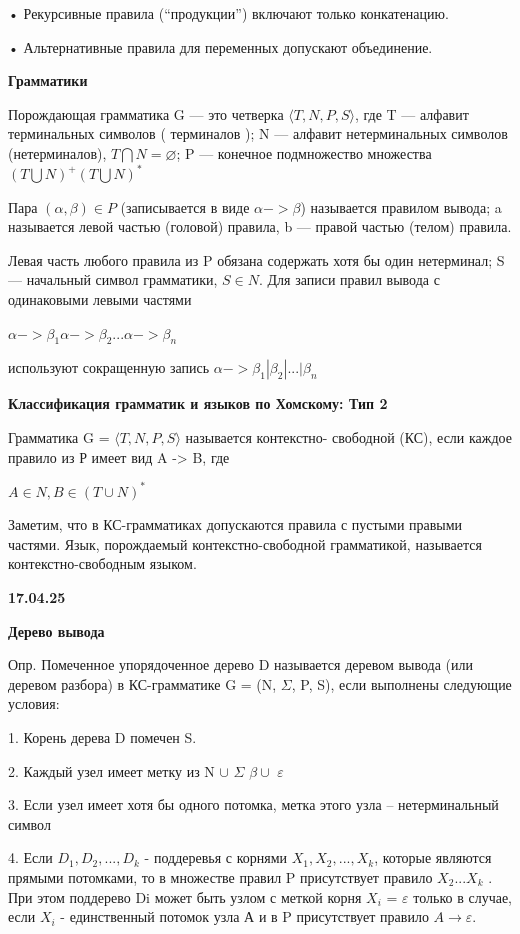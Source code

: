 \documentclass{article}
\begin{document}
• Рекурсивные правила (“продукции”) включают только конкатенацию.

• Альтернативные правила для переменных допускают объединение.



\textbf{Грамматики}


Порождающая грамматика G — это четверка $\langle T, N, P, S  \rangle $,
где T — алфавит терминальных символов ( терминалов );
N — алфавит нетерминальных символов (нетерминалов), $T \bigcap N =\varnothing$;
P — конечное подмножество множества $(T \bigcup N)^+ (T \bigcup N)^*$

Пара $(\alpha, \beta)\in P$ (записывается в виде $\alpha -> \beta$) называется правилом вывода;
a называется левой частью (головой) правила, b — правой частью (телом)
правила.

Левая часть любого правила из P обязана содержать хотя бы один
нетерминал;
S — начальный символ грамматики, $S \in N$.
Для записи правил вывода с одинаковыми левыми частями

$\alpha -> \beta_1 \alpha -> \beta_2 ... \alpha -> \beta_n$

используют сокращенную запись $\alpha -> \beta_1 | \beta_2 |...| \beta_n$

\textbf{Классификация грамматик и языков по Хомскому: Тип 2}

Грамматика G = $ \langle T, N, P, S \rangle $ называется контекстно-
свободной (КС), если каждое правило из Р имеет вид A -> B, где

$A \in N, B \in ( T \cup N )^*$

Заметим, что в КС-грамматиках допускаются правила с пустыми
правыми частями. Язык, порождаемый контекстно-свободной
грамматикой, называется контекстно-свободным языком.


\vspace{1cm}

\textbf{17.04.25}


\textbf{Дерево вывода}

Опр. Помеченное упорядоченное дерево D называется деревом
вывода (или деревом разбора) в КС-грамматике G = (N, $\Sigma $, P, S), если
выполнены следующие условия:

1. Корень дерева D помечен S.

2. Каждый узел имеет метку из N $\cup $ $\Sigma$ $\beta \cup$ {$\varepsilon$}

3. Если узел имеет хотя бы одного потомка, метка этого узла –
нетерминальный символ

4. Если $D_1,D_2 , ... ,D_k$ - поддеревья с корнями $X_1, X_2 , ... , X_k$, которые
являются прямыми потомками, то в множестве правил P
присутствует правило $X_2 ... X_k$ . При этом поддерево Di может быть
узлом с меткой корня $X_i$ = $\varepsilon $ только в случае, 
если $X_i$ - единственный
потомок узла А и в P присутствует правило $A \rightarrow  \varepsilon$.
\end{document}
